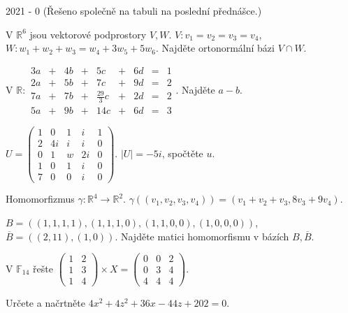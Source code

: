 
\newpage
{\large 2021 - 0} (Řešeno společně na tabuli na poslední přednášce.)

\begin{questions}

\question V \(\mathbb{R}^6\) jsou vektorové podprostory \(V, W\). \(V: v_1 = v_2 = v_3 = v_4\), \(W: w_1 + w_2 + w_3 = w_4 + 3w_5 + 5w_6\). Najděte ortonormální bázi \(V \cap W\).

\question V \(\mathbb{R}: \begin{matrix}
    3a & + & 4b & + &            5c & + & 6d & = & 1\\
    2a & + & 5b & + &            7c & + & 9d & = & 2\\
    7a & + & 7b & + & \frac{29}{3}c & + & 2d & = & 2\\
    5a & + & 9b & + &           14c & + & 6d & = & 3
\end{matrix}\). Najděte \(a-b\).

\newpage

\question \(U = \begin{pmatrix}
    1 &  0 & 1 &  i & 1\\
    2 & 4i & i &  i & 0\\
    0 &  1 & w & 2i & 0\\
    1 &  0 & 1 &  i & 0\\
    7 &  0 & 0 &  i & 0
\end{pmatrix}\). \(|U| = -5i\), spočtěte \(u\).

\question Homomorfizmus \(\gamma: \mathbb{R}^4 \rightarrow \mathbb{R}^2\). \(\gamma((v_1, v_2, v_3, v_4)) = (v_1+v_2+v_3, 8v_3+9v_4)\).

\(B = ((1,1,1,1),(1,1,1,0),(1,1,0,0),(1,0,0,0))\), \(\overline{B} = ((2,11),(1,0))\). Najděte matici homomorfismu v bázích \(B, \overline{B}\).

\newpage

\question V \(\mathbb{F}_{14}\) řešte \(\begin{pmatrix}
    1 & 2\\
    1 & 3\\
    1 & 4
\end{pmatrix} \times X = \begin{pmatrix}
    0 & 0 & 2\\
    0 & 3 & 4\\
    4 & 4 & 4
\end{pmatrix}\).

\question Určete a načrtněte \(4x^2 + 4z^2 + 36x - 44z + 202 = 0\).

\end{questions}
